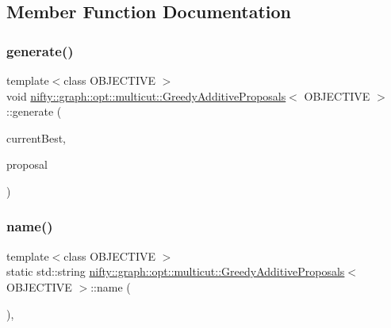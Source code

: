 \subsection{Member Function Documentation}
\mbox{\label{classnifty_1_1graph_1_1opt_1_1multicut_1_1GreedyAdditiveProposals_a084ca7ba230e26884a2ecbb694415df6}} 
\subsubsection{\texorpdfstring{generate()}{generate()}}
{\footnotesize\ttfamily template$<$class O\+B\+J\+E\+C\+T\+I\+VE $>$ \\
void \hyperlink{classnifty_1_1graph_1_1opt_1_1multicut_1_1GreedyAdditiveProposals}{nifty\+::graph\+::opt\+::multicut\+::\+Greedy\+Additive\+Proposals}$<$ O\+B\+J\+E\+C\+T\+I\+VE $>$\+::generate (\begin{DoxyParamCaption}\item[{const \hyperlink{classnifty_1_1graph_1_1opt_1_1multicut_1_1GreedyAdditiveProposals_a4097016ca99d6d2aab8f3a8a9432f001}{Node\+Labels\+Type} \&}]{current\+Best,  }\item[{\hyperlink{classnifty_1_1graph_1_1opt_1_1multicut_1_1GreedyAdditiveProposals_a4097016ca99d6d2aab8f3a8a9432f001}{Node\+Labels\+Type} \&}]{proposal }\end{DoxyParamCaption})\hspace{0.3cm}{\ttfamily [inline]}}

\mbox{\label{classnifty_1_1graph_1_1opt_1_1multicut_1_1GreedyAdditiveProposals_aa01754a86f77c4637a4c8497ff1d4cbd}} 
\subsubsection{\texorpdfstring{name()}{name()}}
{\footnotesize\ttfamily template$<$class O\+B\+J\+E\+C\+T\+I\+VE $>$ \\
static std\+::string \hyperlink{classnifty_1_1graph_1_1opt_1_1multicut_1_1GreedyAdditiveProposals}{nifty\+::graph\+::opt\+::multicut\+::\+Greedy\+Additive\+Proposals}$<$ O\+B\+J\+E\+C\+T\+I\+VE $>$\+::name (\begin{DoxyParamCaption}{ }\end{DoxyParamCaption})\hspace{0.3cm}{\ttfamily [inline]}, {\ttfamily [static]}}

